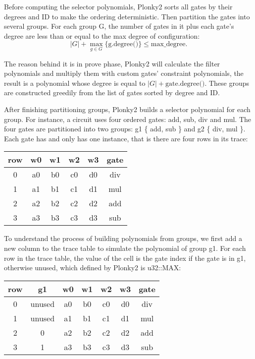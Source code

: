 Before computing the selector polynomials, Plonky2 sorts all gates by their degrees and ID
to make the ordering deterministic. Then partition the gates into several groups. For each
group G, the number of gates in it plus each gate's degree are less than or equal to the 
max degree of configuration:
\[ |G| + \max_{g \in G}\{\text{g.degree()}\} \le \text{max\_degree}. \]

The reason behind it is in prove phase, Plonky2 will calculate the filter polynomials and
multiply them with custom gates' constraint polynomials, the result is a polynomial whose 
degree is equal to $|G| + \text{gate.degree()}$. These groups are constructed greedily from the 
list of gates sorted by degree and ID.

After finishing partitioning groups, Plonky2 builds a selector polynomial for each group. 
For instance, a circuit uses four ordered gates: add, sub, div and mul. The four gates are
partitioned into two groups: g1 \{ add, sub \} and g2 \{ div, mul \}. Each gate has and only has
one instance, that is there are four rows in its trace:

\begin{center}
    \begin{tabular}{ |c|c|c|c|c|c| }
        \hline
        row  & w0 & w1 & w2 & w3 & gate \\
        \hline
        0  & a0 & b0 & c0 & d0 & div \\
        \hline
        1  & a1 & b1 & c1 & d1 & mul \\
        \hline
        2  & a2 & b2 & c2 & d2 & add \\
        \hline
        3  & a3 & b3 & c3 & d3 & sub \\
        \hline
    \end{tabular}
\end{center}

To understand the process of building polynomials from groups, we first add a new column to the
trace table to simulate the polynomial of group g1. For each row in the trace table, the value of the cell is
the gate index if the gate is in g1, otherwise unused, which defined by Plonky2 is u32::MAX:

\begin{center}
    \begin{tabular}{ |c|c|c|c|c|c|c| }
        \hline
        row & g1 & w0 & w1 & w2 & w3 & gate \\
        \hline
        0 & unused & a0 & b0 & c0 & d0 & div \\
        \hline
        1 & unused & a1 & b1 & c1 & d1 & mul \\
        \hline
        2 & 0 & a2 & b2 & c2 & d2 & add \\
        \hline
        3 & 1 & a3 & b3 & c3 & d3 & sub \\
        \hline
    \end{tabular}
\end{center}

